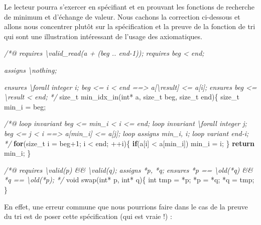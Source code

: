 \documentclass[12pt,francais,]{scrbook}
\newenvironment{Shaded}{}{}
\newcommand{\KeywordTok}[1]{\textcolor[rgb]{0.00,0.44,0.13}{\textbf{{#1}}}}
\newcommand{\DataTypeTok}[1]{\textcolor[rgb]{0.56,0.13,0.00}{{#1}}}
\newcommand{\DecValTok}[1]{\textcolor[rgb]{0.25,0.63,0.44}{{#1}}}
\newcommand{\CommentTok}[1]{\textcolor[rgb]{0.38,0.63,0.69}{\textit{{#1}}}}
\newcommand{\NormalTok}[1]{{#1}}
\newenvironment{zdssecretblock}[1]{%
  \tcolorbox[beamer,%
    noparskip,breakable,
    colback=LightGray,colframe=DarkGray,%
    colbacklower=LightGray,%
    title=#1]
}{\endtcolorbox}
\begin{document}
Le lecteur pourra s'exercer en spécifiant et en prouvant les fonctions
de recherche de minimum et d'échange de valeur. Nous cachons la
correction ci-dessous et allons nous concentrer plutôt sur la
spécification et la preuve de la fonction de tri qui sont une
illustration intéressant de l'usage des axiomatiques.

\begin{zdssecretblock}{Solution}
  \begin{footnotesize}
  \begin{footnotesize}\begin{Shaded}
\begin{Highlighting}[]
\CommentTok{/*@}
\CommentTok{  requires \textbackslash{}valid_read(a + (beg .. end-1));}
\CommentTok{  requires beg < end;}

\CommentTok{  assigns  \textbackslash{}nothing;}

\CommentTok{  ensures  \textbackslash{}forall integer i; beg <= i < end ==> a[\textbackslash{}result] <= a[i];}
\CommentTok{  ensures  beg <= \textbackslash{}result < end;}
\CommentTok{*/}
\NormalTok{size_t min_idx_in(}\DataTypeTok{int}\NormalTok{* a, size_t beg, size_t end)\{}
  \NormalTok{size_t min_i = beg;}

  \CommentTok{/*@}
\CommentTok{    loop invariant beg <= min_i < i <= end;}
\CommentTok{    loop invariant \textbackslash{}forall integer j; beg <= j < i ==> a[min_i] <= a[j];}
\CommentTok{    loop assigns min_i, i;}
\CommentTok{    loop variant end-i;}
\CommentTok{  */}
  \KeywordTok{for}\NormalTok{(size_t i = beg}\DecValTok{+1}\NormalTok{; i < end; ++i)\{}
    \KeywordTok{if}\NormalTok{(a[i] < a[min_i]) min_i = i;}
  \NormalTok{\}}
  \KeywordTok{return} \NormalTok{min_i;}
\NormalTok{\}}

\CommentTok{/*@}
\CommentTok{  requires \textbackslash{}valid(p) && \textbackslash{}valid(q);}
\CommentTok{  assigns  *p, *q;}
\CommentTok{  ensures  *p == \textbackslash{}old(*q) && *q == \textbackslash{}old(*p);}
\CommentTok{*/}
\DataTypeTok{void} \NormalTok{swap(}\DataTypeTok{int}\NormalTok{* p, }\DataTypeTok{int}\NormalTok{* q)\{}
  \DataTypeTok{int} \NormalTok{tmp = *p; *p = *q; *q = tmp;}
\NormalTok{\}}
\end{Highlighting}
  \end{Shaded}\end{footnotesize}
  \end{footnotesize}
\end{zdssecretblock}
  
En effet, une erreur commune que nous pourrions faire dans le cas de la
preuve du tri est de poser cette spécification (qui est vraie !) :
\end{document}

